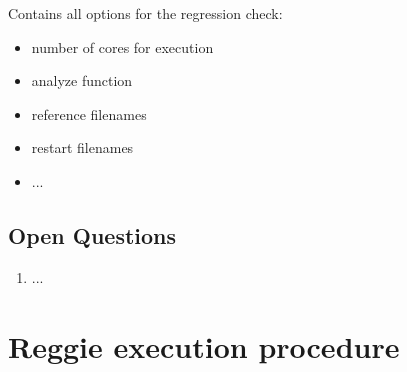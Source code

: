 \documentclass[11pt]{scrartcl}
\begin{document}
Contains all options for the regression check: 
\begin{itemize}
   \item number of cores for execution
   \item analyze function
   \item reference filenames
   \item restart filenames
   \item ...
\end{itemize}

\subsection{Open Questions}

\begin{enumerate}
 \item ...
\end{enumerate}

\section{Reggie execution procedure}
\end{document}
